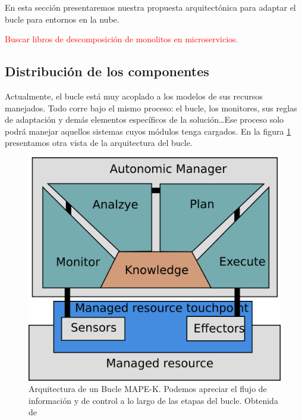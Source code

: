 En esta sección presentaremos nuestra propuesta arquitectónica para adaptar el bucle para entornos en la nube.

\textcolor{red}{Buscar libros de descomposición de monolitos en microservicios.}

\subsection{Distribución de los componentes}

Actualmente, el bucle está muy acoplado a los modelos de sus recursos manejados. Todo corre bajo el mismo proceso: el bucle, los monitores, sus reglas de adaptación y demás elementos específicos de la solución\dots Ese proceso solo podrá manejar aquellos sistemas cuyos módulos tenga cargados. En la figura \ref{fig:bucle-mapek2} presentamos otra vista de la arquitectura del bucle.

\begin{figure}[htb]
  \centering
  \includegraphics[scale=1.15]{01_introduccion/images/bucle-mape-k}
  \caption[Arquitectura de un Bucle MAPE-K. Podemos apreciar el flujo de información y de control a lo largo de las etapas del bucle.]{Arquitectura de un Bucle MAPE-K. Podemos apreciar el flujo de información y de control a lo largo de las etapas del bucle. Obtenida de \cite{fonsEspecificacionSistemasAutoadaptativos2021}}
  \label{fig:bucle-mapek2}
\end{figure}

